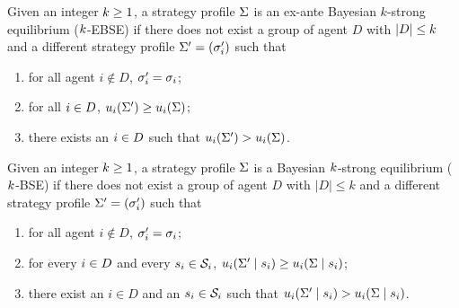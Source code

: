 \begin{definition}

\label{def:ex_ante}
    Given an integer $k \ge 1$, a strategy profile $\Sigma$ is an ex-ante Bayesian $k$-strong equilibrium ($k$-EBSE) if there does not exist a group of agent $D$ with $|D| \le k$ and a different strategy profile $\Sigma' = (\sigma'_{i})$ such that 
    \begin{enumerate}
    \item for all agent $i \not \in D$, $\sigma'_{i} = \sigma_{i}$; 
    \item for all $i\in D$, $ u_i(\Sigma') \ge  u_i(\Sigma)$;
    \item there exists an $i\in D$ such that $u_i(\Sigma') > u_i(\Sigma)$. 
\end{enumerate}
\end{definition}

\begin{definition}
\label{def:qi}
    Given an integer $k \ge 1$, a strategy profile $\Sigma$ is a Bayesian $k$-strong equilibrium ($k$-BSE) if there does not exist a group of agent $D$ with $|D| \le k$ and a different strategy profile $\Sigma' = (\sigma'_{i})$ such that 
    \begin{enumerate}
    \item for all agent $i \not \in D$, $\sigma'_i = \sigma_i$; 
    \item for every $i\in D$ and every $s_i \in \mathcal{S}_i$, $ u_i(\Sigma'\mid s_i) \ge  u_i(\Sigma\mid s_i)$;
    \item there exist an $i\in D$ and an $s_i \in \mathcal{S}_i$ such that $u_i(\Sigma'\mid s_i) > u_i(\Sigma\mid s_i)$. 
\end{enumerate}
\end{definition}


